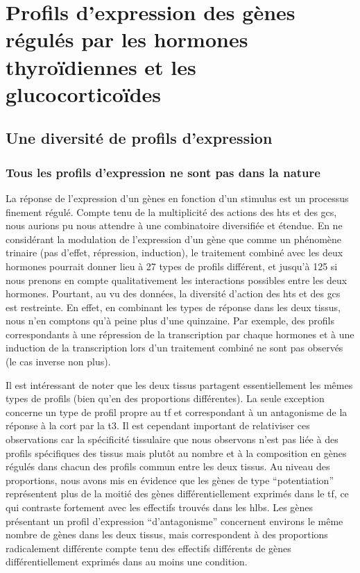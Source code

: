 \documentclass[../main.tex]{subfiles}
\begin{document}
\chapter{Profils d'expression des gènes régulés par les hormones thyroïdiennes et les glucocorticoïdes}


\section{Une diversité de profils d'expression}

	\subsection{Tous les profils d'expression ne sont pas dans la nature}
		La réponse de l'expression d'un gènes en fonction d'un stimulus est un processus finement régulé.
		Compte tenu de la multiplicité des actions des \glspl{ht} et des \glspl{gc}, nous aurions pu nous attendre à une combinatoire diversifiée et étendue.
		En ne considérant la modulation de l'expression d'un gène que comme un phénomène trinaire (pas d'effet, répression, induction), le traitement combiné avec les deux hormones pourrait donner lieu à 27 types de profils différent, et jusqu'à 125 si nous prenons en compte qualitativement les interactions possibles entre les deux hormones.
		Pourtant, au vu des données, la diversité d'action des \glspl{ht} et des \glspl{gc} est restreinte.
		En effet, en combinant les types de réponse dans les deux tissus, nous n'en comptons qu'à peine plus d'une quinzaine.
		Par exemple, des profils correspondants à une répression de la transcription par chaque hormones et à une induction de la transcription lors d'un traitement combiné ne sont pas observés (le cas inverse non plus).
		\par
		Il est intéressant de noter que les deux tissus partagent essentiellement les mêmes types de profils (bien qu'en des proportions différentes).
		La seule exception concerne un type de profil propre au \gls{tf} et correspondant à un antagonisme de la réponse à la \gls{cort} par la \gls{t3}.
		Il est cependant important de relativiser ces observations car la spécificité tissulaire que nous observons n'est pas liée à des profils spécifiques des tissus mais plutôt au nombre et à la composition en gènes régulés dans chacun des profils commun entre les deux tissus.
		Au niveau des proportions, nous avons mis en évidence que les gènes de type ``potentiation'' représentent plus de la moitié des gènes différentiellement exprimés dans le \gls{tf}, ce qui contraste fortement avec les effectifs trouvés dans les \glspl{hlb}.
		Les gènes présentant un profil d'expression ``d'antagonisme'' concernent environs le même nombre de gènes dans les deux tissus, mais correspondent à des proportions radicalement différente compte tenu des effectifs différents de gènes différentiellement exprimés dans au moins une condition.
\end{document}
